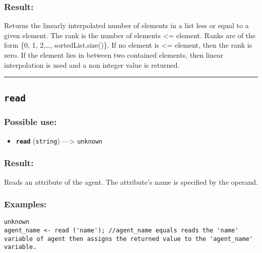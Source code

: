 \documentclass[]{book}
\providecommand{\tightlist}{%
  \setlength{\itemsep}{0pt}\setlength{\parskip}{0pt}}
\theoremstyle{definition}
\theoremstyle{definition}
\theoremstyle{definition}
\theoremstyle{remark}
\begin{document}
\subsubsection{Result:}\label{result-414}

Returns the linearly interpolated number of elements in a list less or
equal to a given element. The rank is the number of elements
\textless{}= element. Ranks are of the form \{0, 1, 2,\ldots{},
sortedList.size()\}. If no element is \textless{}= element, then the
rank is zero. If the element lies in between two contained elements,
then linear interpolation is used and a non integer value is returned.

\begin{center}\rule{0.5\linewidth}{\linethickness}\end{center}

\subsection{\texorpdfstring{\texttt{read}}{read}}\label{read}

\subsubsection{Possible use:}\label{possible-use-429}

\begin{itemize}
\tightlist
\item
  \textbf{\texttt{read}} (\texttt{string}) ---\textgreater{}
  \texttt{unknown}
\end{itemize}

\subsubsection{Result:}\label{result-415}

Reads an attribute of the agent. The attribute's name is specified by
the operand.

\subsubsection{Examples:}\label{examples-294}

\begin{verbatim}
unknown 
agent_name <- read ('name'); //agent_name equals reads the 'name' variable of agent then assigns the returned value to the 'agent_name' variable. 
\end{verbatim}
\end{document}
